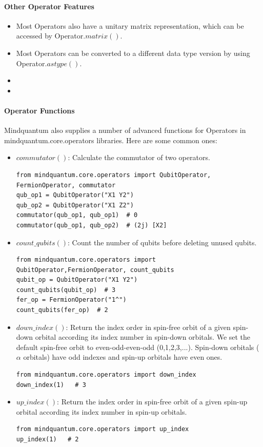 \paragraph{Other Operator Features}
\begin{itemize}
    \item Most Operators also have a unitary matrix representation, which can be accessed by Operator.$matrix()$. 
    \item Most Operators can be converted to a different data type version by using Operator.$astype()$.
    \item 
    \item 
\end{itemize}

\paragraph{Operator Functions}
Mindquantum also supplies a number of advanced functions for Operators in mindquantum.core.operators libraries. Here are some common ones: 
\begin{itemize}
    \item $commutator()$: Calculate the commutator of two operators. 
    \begin{lstlisting}
from mindquantum.core.operators import QubitOperator, FermionOperator, commutator
qub_op1 = QubitOperator("X1 Y2")
qub_op2 = QubitOperator("X1 Z2")
commutator(qub_op1, qub_op1)  # 0
commutator(qub_op1, qub_op2)  # (2j) [X2]
    \end{lstlisting}    
    \item $count\_qubits()$: Count the number of qubits before deleting unused qubits. 
    \begin{lstlisting}
from mindquantum.core.operators import QubitOperator,FermionOperator, count_qubits
qubit_op = QubitOperator("X1 Y2")
count_qubits(qubit_op)  # 3
fer_op = FermionOperator("1^")
count_qubits(fer_op)  # 2
    \end{lstlisting}
    \item $down\_index()$: Return the index order in spin-free orbit of a given spin-down orbital according its index number in spin-down orbitals. We set the default spin-free orbit to even-odd-even-odd (0,1,2,3,...). Spin-down orbitals ($\alpha$ orbitals) have odd indexes and spin-up orbitals have even ones. 
    \begin{lstlisting}
from mindquantum.core.operators import down_index
down_index(1)   # 3
    \end{lstlisting}
    \item $up\_index()$: Return the index order in spin-free orbit of a given spin-up orbital according its index number in spin-up orbitals.
    \begin{lstlisting}
from mindquantum.core.operators import up_index
up_index(1)   # 2
    \end{lstlisting}
\end{itemize}
